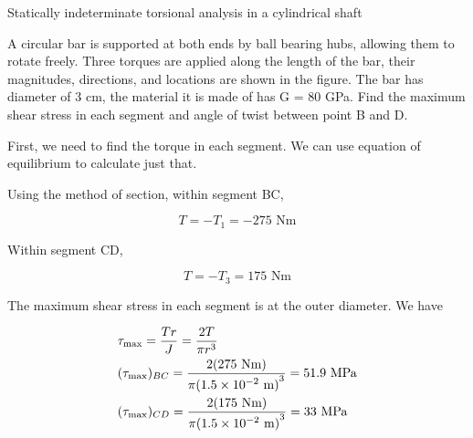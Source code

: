 \documentclass[
fontsize=10pt,
a4paper,
twosides=false,
open=any,
svgnames,
]{kaobook} %
\begin{document}
\begin{example} Statically indeterminate torsional analysis in a cylindrical shaft
  
  A circular bar is supported at both ends by ball bearing hubs, allowing them to rotate freely. Three torques are applied along the length of the bar, their magnitudes, directions, and locations are shown in the figure. The bar has diameter of 3 cm, the material it is made of has G = 80 GPa. Find the maximum shear stress in each segment and angle of twist between point B and D.

  \begin{figure}[H]
  \centering
\end{figure}
  
First, we need to find the torque in each segment. We can use equation of equilibrium to calculate just that.

Using the method of section, within segment BC,

$$T =  - {T_1} =  - 275\text{ Nm}$$

Within segment CD,

\[T =  - {T_3} = 175\text{ Nm}\]

The maximum shear stress in each segment is at the outer diameter. We have

\[\begin{gathered}
  {\tau _{\max }} = \frac{{Tr}}{{{J}}} = \frac{{2T}}{{\pi {r^3}}} \hfill \\
  {({\tau_{\max }})_{BC}} = \frac{{2(275\text{ Nm})}}{{\pi {{(1.5 \times {{10}^{ - 2}}\text{ m})}^3}}} = 51.9\text{ MPa} \hfill \\
  {({\tau _{\max }})_{CD}} = \frac{{2(175\text{ Nm})}}{{\pi {{(1.5 \times {{10}^{ - 2}}\text{ m})}^3}}} = 33\text{ MPa} \hfill \\ 
\end{gathered} \]


\end{example}
\end{document}

